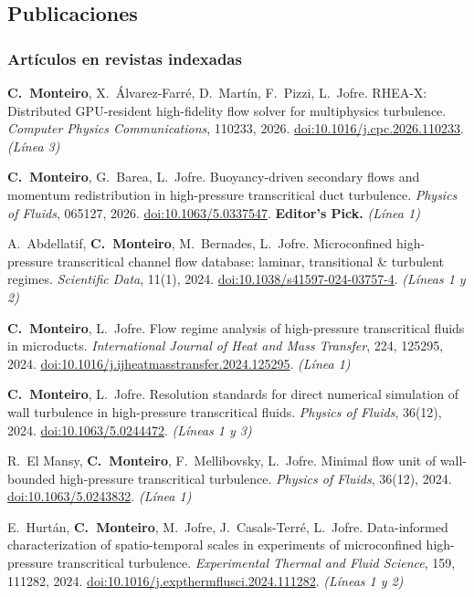 \documentclass[11pt]{article}
\begin{document}
\subsection{Publicaciones}
\subsubsection*{Art\'iculos en revistas indexadas}
\begin{enumerate}[label={[J\arabic*]}]
  \item \textbf{C.\ Monteiro}, X.\ \'Alvarez-Farr\'e, D.\ Mart\'in, F.\ Pizzi, L.\ Jofre.
  RHEA-X: Distributed GPU-resident high-fidelity flow solver for multiphysics turbulence.
  \emph{Computer Physics Communications}, 110233, 2026.
  \href{https://doi.org/10.1016/j.cpc.2026.110233}{doi:10.1016/j.cpc.2026.110233}.  \emph{(L\'inea 3)}
  \item \textbf{C.\ Monteiro}, G.\ Barea, L.\ Jofre. Buoyancy-driven secondary flows and
  momentum redistribution in high-pressure transcritical duct turbulence.
  \emph{Physics of Fluids}, 065127, 2026.
  \href{https://doi.org/10.1063/5.0337547}{doi:10.1063/5.0337547}. \textbf{Editor's Pick.} \emph{(L\'inea 1)}
  \item A.\ Abdellatif, \textbf{C.\ Monteiro}, M.\ Bernades, L.\ Jofre. Microconfined
  high-pressure transcritical channel flow database: laminar, transitional \& turbulent
  regimes. \emph{Scientific Data}, 11(1), 2024.
  \href{https://doi.org/10.1038/s41597-024-03757-4}{doi:10.1038/s41597-024-03757-4}. \emph{(L\'ineas 1 y 2)}
  \item \textbf{C.\ Monteiro}, L.\ Jofre. Flow regime analysis of high-pressure
  transcritical fluids in microducts. \emph{International Journal of Heat and Mass
  Transfer}, 224, 125295, 2024.
  \href{https://doi.org/10.1016/j.ijheatmasstransfer.2024.125295}{doi:10.1016/j.ijheatmasstransfer.2024.125295}. \emph{(L\'inea 1)}
  \item \textbf{C.\ Monteiro}, L.\ Jofre. Resolution standards for direct numerical
  simulation of wall turbulence in high-pressure transcritical fluids. \emph{Physics of
  Fluids}, 36(12), 2024.
  \href{https://doi.org/10.1063/5.0244472}{doi:10.1063/5.0244472}. \emph{(L\'ineas 1 y 3)}
  \item R.\ El Mansy, \textbf{C.\ Monteiro}, F.\ Mellibovsky, L.\ Jofre. Minimal flow unit
  of wall-bounded high-pressure transcritical turbulence. \emph{Physics of Fluids},
  36(12), 2024.
  \href{https://doi.org/10.1063/5.0243832}{doi:10.1063/5.0243832}. \emph{(L\'inea 1)}
  \item E.\ Hurt\'an, \textbf{C.\ Monteiro}, M.\ Jofre, J.\ Casals-Terr\'e, L.\ Jofre.
  Data-informed characterization of spatio-temporal scales in experiments of microconfined
  high-pressure transcritical turbulence. \emph{Experimental Thermal and Fluid Science},
  159, 111282, 2024.
  \href{https://doi.org/10.1016/j.expthermflusci.2024.111282}{doi:10.1016/j.expthermflusci.2024.111282}. \emph{(L\'ineas 1 y 2)}
\end{enumerate}
\end{document}
